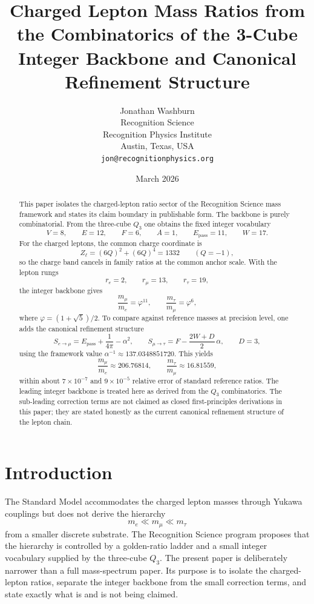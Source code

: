\documentclass[11pt]{article}
\title{Charged Lepton Mass Ratios from the Combinatorics of the 3-Cube\\
\large Integer Backbone and Canonical Refinement Structure}
\author{Jonathan Washburn\\
Recognition Science\\
Recognition Physics Institute\\
Austin, Texas, USA\\
\texttt{jon@recognitionphysics.org}}
\date{March 2026}
\newcommand{\phig}{\varphi}
\newcommand{\Epass}{E_{\mathrm{pass}}}
\begin{document}
\maketitle

\begin{abstract}
This paper isolates the charged-lepton ratio sector of the Recognition Science mass framework and states its claim boundary in publishable form. The backbone is purely combinatorial. From the three-cube \(Q_3\) one obtains the fixed integer vocabulary
\[
V=8,\qquad E=12,\qquad F=6,\qquad A=1,\qquad \Epass=11,\qquad W=17.
\]
For the charged leptons, the common charge coordinate is
\[
Z_\ell=(6Q)^2+(6Q)^4=1332\qquad (Q=-1),
\]
so the charge band cancels in family ratios at the common anchor scale. With the lepton rungs
\[
r_e=2,\qquad r_\mu=13,\qquad r_\tau=19,
\]
the integer backbone gives
\[
\frac{m_\mu}{m_e}=\phig^{11},\qquad \frac{m_\tau}{m_\mu}=\phig^{6},
\]
where \(\phig=(1+\sqrt5)/2\). To compare against reference masses at precision level, one adds the canonical refinement structure
\[
S_{e\to\mu}=\Epass+\frac{1}{4\pi}-\alpha^2,
\qquad
S_{\mu\to\tau}=F-\frac{2W+D}{2}\,\alpha,
\qquad D=3,
\]
using the framework value \(\alpha^{-1}\approx137.0348851720\). This yields
\[
\frac{m_\mu}{m_e}\approx206.76814,
\qquad
\frac{m_\tau}{m_\mu}\approx16.81559,
\]
within about \(7\times10^{-7}\) and \(9\times10^{-5}\) relative error of standard reference ratios. The leading integer backbone is treated here as derived from the \(Q_3\) combinatorics. The sub-leading correction terms are not claimed as closed first-principles derivations in this paper; they are stated honestly as the current canonical refinement structure of the lepton chain.
\end{abstract}

\section{Introduction}

The Standard Model accommodates the charged lepton masses through Yukawa couplings but does not derive the hierarchy
\[
m_e \ll m_\mu \ll m_\tau
\]
from a smaller discrete substrate. The Recognition Science program proposes that the hierarchy is controlled by a golden-ratio ladder and a small integer vocabulary supplied by the three-cube \(Q_3\). The present paper is deliberately narrower than a full mass-spectrum paper. Its purpose is to isolate the charged-lepton ratios, separate the integer backbone from the small correction terms, and state exactly what is and is not being claimed.
\end{document}
